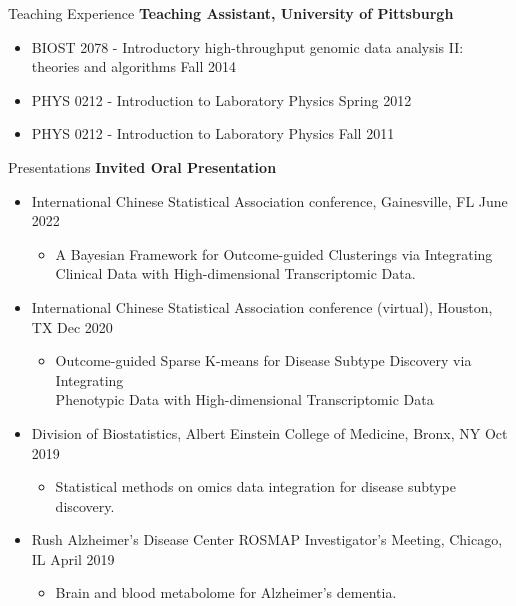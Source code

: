 \documentclass{resume} %
\begin{document}
\begin{rSection}{Teaching Experience }
\textbf{Teaching Assistant, University of Pittsburgh}
\begin{itemize}[noitemsep,topsep=0pt]
\item BIOST 2078 - Introductory high-throughput genomic data analysis II: \\theories and algorithms \hfill {Fall 2014}
\item PHYS 0212 - Introduction to Laboratory Physics \hfill {Spring 2012}
\item PHYS 0212 - Introduction to Laboratory Physics \hfill {Fall 2011}
\end{itemize}

\end{rSection}

\begin{rSection}{Presentations}
\textbf{Invited Oral Presentation}

\begin{itemize}[noitemsep,topsep=0pt]

\item  International Chinese Statistical Association conference, Gainesville, FL  \hfill {June 2022}
\begin{itemize}[noitemsep,topsep=0pt]
\item{A Bayesian Framework for Outcome-guided Clusterings via Integrating \\Clinical Data with High-dimensional Transcriptomic Data.}
\end{itemize}

\item  International Chinese Statistical Association conference (virtual), Houston, TX  \hfill {Dec 2020}
\begin{itemize}[noitemsep,topsep=0pt]
\item{Outcome-guided Sparse K-means for Disease Subtype Discovery via Integrating \\Phenotypic Data with High-dimensional Transcriptomic Data}
\end{itemize}

\item  Division of Biostatistics,  Albert Einstein College of Medicine, Bronx, NY  \hfill {Oct 2019}
\begin{itemize}[noitemsep,topsep=0pt]
\item{Statistical methods on omics data integration for disease subtype discovery.}
\end{itemize}

\item  Rush Alzheimer's Disease Center ROSMAP Investigator's Meeting, Chicago, IL  \hfill {April 2019}
\begin{itemize}[noitemsep,topsep=0pt]
\item{Brain and blood metabolome for Alzheimer's dementia.}
\end{itemize}


\end{itemize}
\end{rSection}
\end{document}
